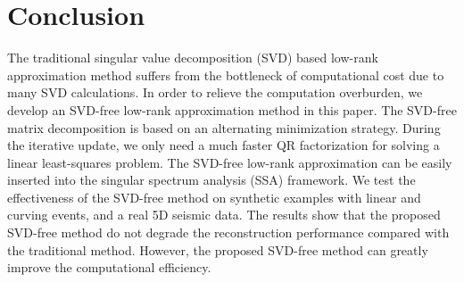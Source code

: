 \section{Conclusion}
The traditional singular value decomposition (SVD) based low-rank approximation method suffers from the bottleneck of computational cost due to many SVD calculations. In order to relieve the computation overburden, we develop an SVD-free low-rank approximation method in this paper. The SVD-free matrix decomposition is based on an alternating minimization strategy. During the iterative update, we only need a much faster QR factorization for solving a linear least-squares problem. The SVD-free low-rank approximation can be easily inserted into the singular spectrum analysis (SSA) framework. We test the effectiveness of the SVD-free method on synthetic examples with linear and curving events,  and a real 5D seismic data. The results show that the proposed SVD-free method do not degrade the reconstruction performance compared with the traditional method. However, the proposed SVD-free method can greatly improve the computational efficiency. 


